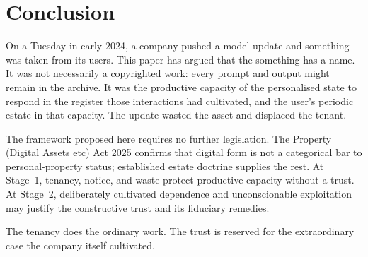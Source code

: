 \newpage
\section{Conclusion}
\label{sec:conclusion}


\bigskip

On a Tuesday in early 2024, a company pushed a model update and something was taken from its users. This paper has argued that the something has a name. It was not necessarily a copyrighted work: every prompt and output might remain in the archive. It was the productive capacity of the personalised state to respond in the register those interactions had cultivated, and the user's periodic estate in that capacity. The update wasted the asset and displaced the tenant.

The framework proposed here requires no further legislation. The Property (Digital Assets etc) Act 2025 confirms that digital form is not a categorical bar to personal-property status; established estate doctrine supplies the rest. At Stage~1, tenancy, notice, and waste protect productive capacity without a trust. At Stage~2, deliberately cultivated dependence and unconscionable exploitation may justify the constructive trust and its fiduciary remedies.

The tenancy does the ordinary work. The trust is reserved for the extraordinary case the company itself cultivated.

